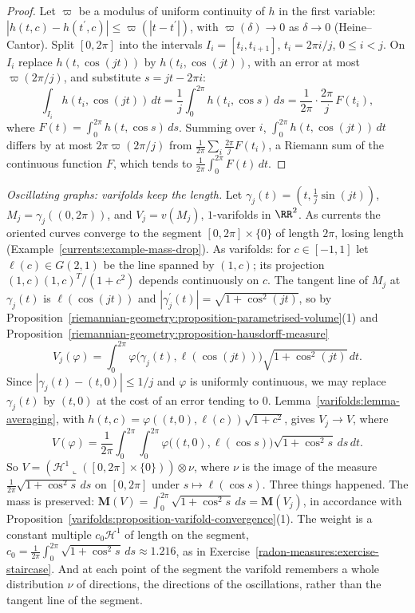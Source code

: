 \begin{proof}
Let $\varpi$ be a modulus of uniform continuity of $h$ in the first variable: $|h(t, c) - h(t^{\prime}, c)| \leq \varpi(|t - t^{\prime}|)$, with $\varpi(\delta) \to 0$ as $\delta \to 0$ (Heine--Cantor). Split
$[0, 2\pi]$ into the intervals $I_i = [t_i, t_{i+1}]$, $t_i = 2\pi i/j$, $0 \leq i < j$. On $I_i$ replace $h(t, \cos(jt))$ by $h(t_i, \cos(jt))$, with an error at most $\varpi(2\pi/j)$, and substitute
$s = jt - 2\pi i$:
\[
\int_{I_i}h(t_i, \cos(jt))\,dt = \frac1j\int_0^{2\pi}h(t_i, \cos s)\,ds = \frac1{2\pi}\cdot\frac{2\pi}j\,F(t_i),
\]
where $F(t) = \int_0^{2\pi}h(t, \cos s)\,ds$.
Summing over $i$, $\int_0^{2\pi}h(t, \cos(jt))\,dt$ differs by at most $2\pi\varpi(2\pi/j)$ from $\frac1{2\pi}\sum_i\frac{2\pi}jF(t_i)$, a Riemann sum of the continuous function $F$, which tends to
$\frac1{2\pi}\int_0^{2\pi}F(t)\,dt$.
\end{proof}

\begin{example}\label{varifolds:example-oscillating}
\emph{Oscillating graphs: varifolds keep the length.} Let $\gamma_j(t) = (t, \frac1j\sin(jt))$, $M_j = \gamma_j((0, 2\pi))$, and $V_j = v(M_j)$, $1$-varifolds in $\RR^2$. As currents the oriented curves
converge to the segment $[0, 2\pi] \times \{0\}$ of length $2\pi$, losing length (Example~\ref{currents:example-mass-drop}). As varifolds: for $c \in [-1, 1]$ let $\ell(c) \in G(2, 1)$ be the line spanned by
$(1, c)$; its projection $(1, c)(1, c)^T/(1 + c^2)$ depends continuously on $c$. The tangent line of $M_j$ at $\gamma_j(t)$ is $\ell(\cos(jt))$ and $|\gamma_j^{\prime}(t)| = \sqrt{1 + \cos^2(jt)}$, so by
Proposition~\ref{riemannian-geometry:proposition-parametrised-volume}(1) and Proposition~\ref{riemannian-geometry:proposition-hausdorff-measure}
\[
V_j(\varphi) = \int_0^{2\pi}\varphi\bigl(\gamma_j(t), \ell(\cos(jt))\bigr)\sqrt{1 + \cos^2(jt)}\,dt .
\]
Since $|\gamma_j(t) - (t, 0)| \leq 1/j$ and $\varphi$ is uniformly continuous, we may replace $\gamma_j(t)$ by $(t, 0)$ at the cost of an error tending to $0$. Lemma~\ref{varifolds:lemma-averaging}, with
$h(t, c) = \varphi((t, 0), \ell(c))\sqrt{1 + c^2}$, gives $V_j \to V$, where
\[
V(\varphi) = \frac1{2\pi}\int_0^{2\pi}\int_0^{2\pi}\varphi\bigl((t, 0), \ell(\cos s)\bigr)\sqrt{1 + \cos^2s}\,ds\,dt .
\]
So $V = (\mathcal{H}^1\llcorner([0, 2\pi] \times \{0\})) \otimes \nu$, where $\nu$ is the image of the measure $\frac1{2\pi}\sqrt{1 + \cos^2s}\,ds$ on $[0, 2\pi]$ under $s \mapsto \ell(\cos s)$. Three things
happened. The mass is preserved: $\mathbf{M}(V) = \int_0^{2\pi}\sqrt{1 + \cos^2s}\,ds = \mathbf{M}(V_j)$, in accordance with Proposition~\ref{varifolds:proposition-varifold-convergence}(1). The weight is a
constant multiple $c_0\mathcal{H}^1$ of length on the segment, $c_0 = \frac1{2\pi}\int_0^{2\pi}\sqrt{1 + \cos^2s}\,ds \approx 1.216$, as in Exercise~\ref{radon-measures:exercise-staircase}. And at each point of
the segment the varifold remembers a whole distribution $\nu$ of directions, the directions of the oscillations, rather than the tangent line of the segment.
\end{example}

